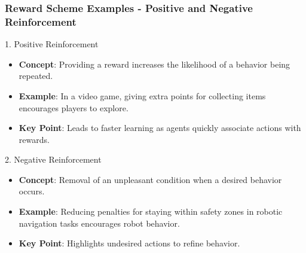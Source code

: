 \documentclass[aspectratio=169]{beamer}
\begin{document}
\begin{frame}[fragile]
    \frametitle{Reward Scheme Examples - Positive and Negative Reinforcement}
    \begin{block}{1. Positive Reinforcement}
        \begin{itemize}
            \item \textbf{Concept}: Providing a reward increases the likelihood of a behavior being repeated.
            \item \textbf{Example}: In a video game, giving extra points for collecting items encourages players to explore.
            \item \textbf{Key Point}: Leads to faster learning as agents quickly associate actions with rewards.
        \end{itemize}
    \end{block}
    
    \begin{block}{2. Negative Reinforcement}
        \begin{itemize}
            \item \textbf{Concept}: Removal of an unpleasant condition when a desired behavior occurs.
            \item \textbf{Example}: Reducing penalties for staying within safety zones in robotic navigation tasks encourages robot behavior.
            \item \textbf{Key Point}: Highlights undesired actions to refine behavior.
        \end{itemize}
    \end{block}
\end{frame}
\end{document}
